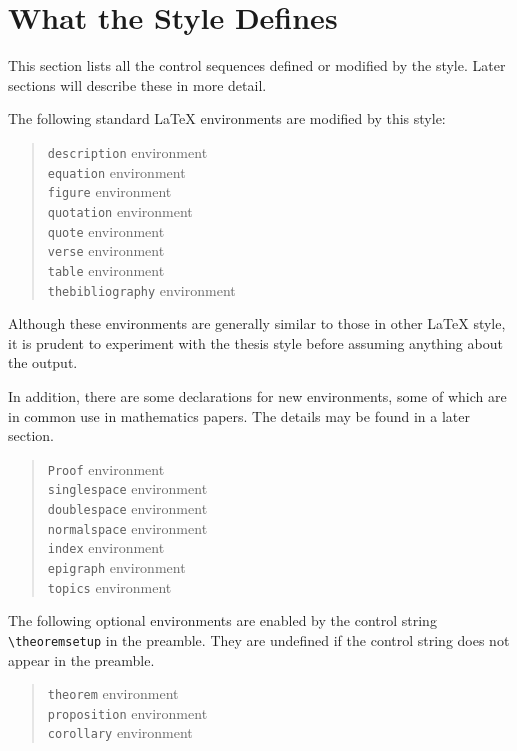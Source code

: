 \section{What the Style Defines}

This section lists all the control sequences defined or modified by the
style. Later sections will describe these in more detail.

\noindent The following standard \LaTeX{} environments are modified by
this style:

\begin{quote}
\verb|description| environment \\
\verb|equation| environment \\
\verb|figure| environment \\
\verb|quotation| environment \\
\verb|quote| environment \\
\verb|verse| environment \\
\verb|table| environment \\
\verb|thebibliography| environment
\end{quote}

\noindent Although these environments are generally similar to those in
other \LaTeX{} style, it is prudent to experiment with the thesis style
before assuming anything about the output.
\bigskip

\noindent In addition, there are some declarations for new environments,
some of which are in common use in mathematics papers. The details may
be found in a later section.

\begin{quote}
\verb|Proof|  environment\\
\verb|singlespace|  environment\\
\verb|doublespace|  environment\\
\verb|normalspace|  environment\\
\verb|index| environment \\
\verb|epigraph|  environment \\
\verb|topics|  environment
\end{quote}

The following optional environments are enabled by the control string
\verb"\theoremsetup" in the preamble. They are undefined if the control
string does not appear in the preamble.

\begin{quote}
\verb|theorem|  environment\\
\verb|proposition|  environment\\
\verb|corollary|  environment
\end{quote}


